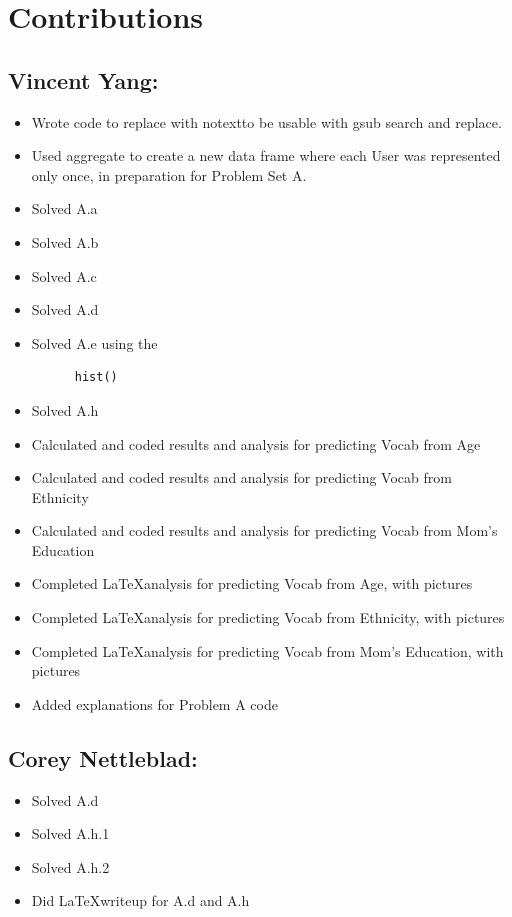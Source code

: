 \documentclass{article}
\begin{document}
\section*{Contributions}
  \subsection*{Vincent Yang:}
  \begin{itemize}
    \item Wrote code to replace \textbar \textbar with \textbar notext\textbar to be usable with 
      gsub search and replace. 
    \item Used aggregate to create a new data frame where each User was represented only once, in 
      preparation for Problem Set A. 
    \item Solved A.a
    \item Solved A.b
    \item Solved A.c
    \item Solved A.d
    \item Solved A.e using the 
      \lstset{language=R}
      \begin{lstlisting}
      hist()
      \end{lstlisting}
    \item Solved A.h
    \item Calculated and coded results and analysis for predicting Vocab from Age
    \item Calculated and coded results and analysis for predicting Vocab from Ethnicity
    \item Calculated and coded results and analysis for predicting Vocab from Mom's Education
    \item Completed \LaTeX  analysis for predicting Vocab from Age, with pictures
    \item Completed \LaTeX  analysis for predicting Vocab from Ethnicity, with pictures
    \item Completed \LaTeX  analysis for predicting Vocab from Mom's Education, with pictures
    \item Added explanations for Problem A code
  \end{itemize}

  \subsection*{Corey Nettleblad:}
  \begin{itemize}
  \item Solved A.d
  \item Solved A.h.1
  \item Solved A.h.2
  \item Did \LaTeX  writeup for A.d and A.h
  
  \end{itemize}
\end{document}
